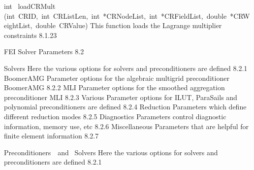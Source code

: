 \documentclass{article}
\begin{document}
\begin{cxxentry}
\begin{cxxentry}
\begin{cxxfunction}
\begin{cxxdoc}
\end{cxxdoc}
\end{cxxfunction}
\begin{cxxfunction}
{int\ }
        {loadCRMult}
        {(int\ CRID,\ int\ CRListLen,\ int\ *CRNodeList,\ int\ *CRFieldList,\ double\ *CRWeightList,\ double\ CRValue)}
        {
This function loads the Lagrange multiplier constraints
}
        {8.1.23}
\begin{cxxdoc}

\end{cxxdoc}
\end{cxxfunction}
\end{cxxentry}
\begin{cxxentry}
{}
        {FEI Solver Parameters}
        {}
        {
}
        {8.2}
\begin{cxxnames}
        {Solvers}
        {}
        {
Here the various options for solvers and preconditioners
are defined}
        {8.2.1}
\cxxitem{}
        {BoomerAMG}
        {}
        {
Parameter options for the algebraic multigrid preconditioner BoomerAMG}
        {8.2.2}
\cxxitem{}
        {MLI}
        {}
        {
Parameter options for the smoothed aggregation preconditioner MLI}
        {8.2.3}
\cxxitem{}
        {Various}
        {}
        {
Parameter options for ILUT, ParaSails and polynomial preconditioners
are defined}
        {8.2.4}
        {Reduction}
        {}
        {
Parameters which define different reduction modes}
        {8.2.5}
        {Diagnostics}
        {}
        {
Parameters control diagnostic information, memory use, etc}
        {8.2.6}
\cxxitem{}
        {Miscellaneous}
        {}
        {
Parameters that are helpful for finite element information}
        {8.2.7}
\end{cxxnames}
\begin{cxxentry}
{Preconditioners\ \ and\ }
        {Solvers}
        {}
        {
Here the various options for solvers and preconditioners
are defined}
        {8.2.1}
\begin{cxxdoc}


\end{cxxdoc}
\end{cxxentry}
\end{cxxentry}
\end{cxxentry}
\end{document}
